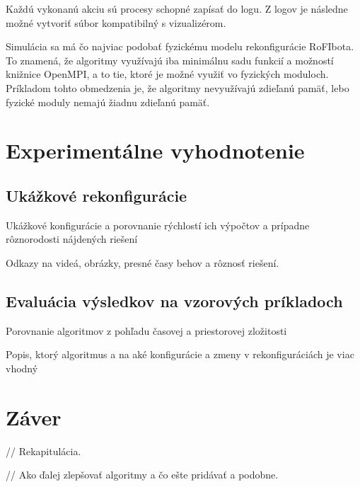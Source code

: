 \documentclass[
  digital, %
  oneside, %
  table,   %
  lof,     %
  nolot,     %
]{fithesis3}
\begin{document}
Každú vykonanú akciu sú procesy schopné zapísať do logu. Z logov je následne možné vytvoriť súbor kompatibilný s vizualizérom. 

Simulácia sa má čo najviac podobať fyzickému modelu rekonfigurácie RoFIbota. To znamená, že algoritmy využívajú iba minimálnu sadu funkcií a možností knižnice OpenMPI, a to tie, ktoré je možné využiť vo fyzických moduloch. Príkladom tohto obmedzenia je, že algoritmy nevyužívajú zdieľanú pamäť, lebo fyzické moduly nemajú žiadnu zdieľanú pamäť. 





\chapter{Experimentálne vyhodnotenie}
\section{Ukážkové rekonfigurácie}
Ukážkové konfigurácie a porovnanie rýchlostí ich výpočtov a prípadne rôznorodosti nájdených riešení

Odkazy na videá, obrázky, presné časy behov a rôznosť riešení. 
\section{Evaluácia výsledkov na vzorových príkladoch}
Porovnanie algoritmov z pohľadu časovej a priestorovej zložitosti

Popis, ktorý algoritmus a na aké konfigurácie a zmeny v rekonfiguráciách je viac vhodný






\chapter{Záver}
\label{sec:future}
// Rekapitulácia. 

// Ako ďalej zlepšovať algoritmy a čo ešte pridávať a podobne. 
\end{document}
